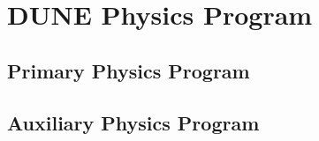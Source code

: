 \chapter{DUNE Physics Program}
\label{ch:exec-summ-phys-prog}



\section{Primary Physics Program}
\label{sec:exec-summ-phys-prog-prim}


\section{Auxiliary Physics Program}
\label{sec:exec-summ-phys-prog-aux}

